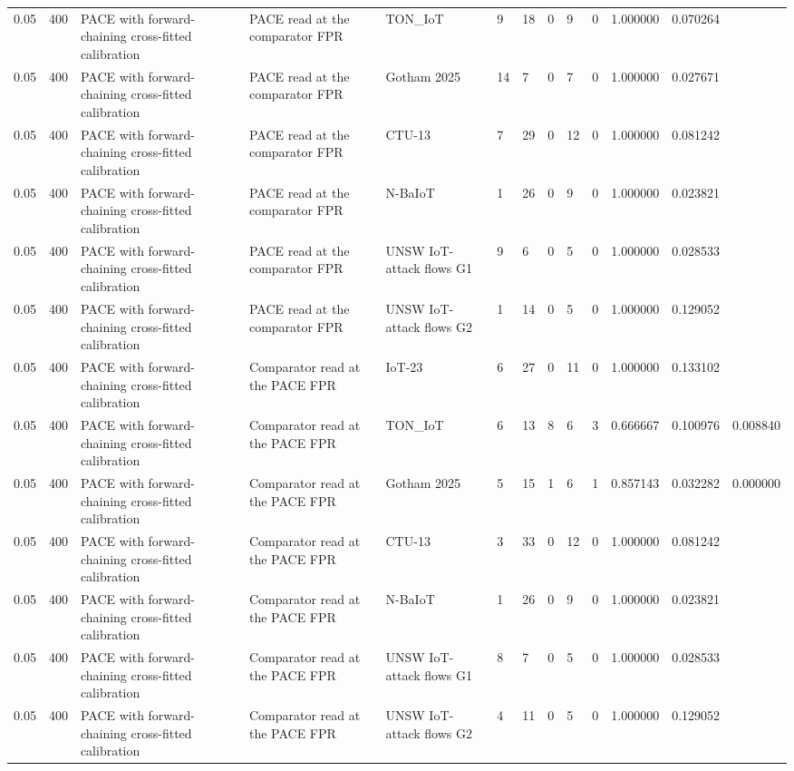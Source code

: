 \begin{tabular}{lllllllllllll}
0.05 & 400 & PACE with forward-chaining cross-fitted calibration & PACE read at the comparator FPR & TON\_IoT & 9 & 18 & 0 & 9 & 0 & 1.000000 & 0.070264 &  \\
0.05 & 400 & PACE with forward-chaining cross-fitted calibration & PACE read at the comparator FPR & Gotham 2025 & 14 & 7 & 0 & 7 & 0 & 1.000000 & 0.027671 &  \\
0.05 & 400 & PACE with forward-chaining cross-fitted calibration & PACE read at the comparator FPR & CTU-13 & 7 & 29 & 0 & 12 & 0 & 1.000000 & 0.081242 &  \\
0.05 & 400 & PACE with forward-chaining cross-fitted calibration & PACE read at the comparator FPR & N-BaIoT & 1 & 26 & 0 & 9 & 0 & 1.000000 & 0.023821 &  \\
0.05 & 400 & PACE with forward-chaining cross-fitted calibration & PACE read at the comparator FPR & UNSW IoT-attack flows G1 & 9 & 6 & 0 & 5 & 0 & 1.000000 & 0.028533 &  \\
0.05 & 400 & PACE with forward-chaining cross-fitted calibration & PACE read at the comparator FPR & UNSW IoT-attack flows G2 & 1 & 14 & 0 & 5 & 0 & 1.000000 & 0.129052 &  \\
0.05 & 400 & PACE with forward-chaining cross-fitted calibration & Comparator read at the PACE FPR & IoT-23 & 6 & 27 & 0 & 11 & 0 & 1.000000 & 0.133102 &  \\
0.05 & 400 & PACE with forward-chaining cross-fitted calibration & Comparator read at the PACE FPR & TON\_IoT & 6 & 13 & 8 & 6 & 3 & 0.666667 & 0.100976 & 0.008840 \\
0.05 & 400 & PACE with forward-chaining cross-fitted calibration & Comparator read at the PACE FPR & Gotham 2025 & 5 & 15 & 1 & 6 & 1 & 0.857143 & 0.032282 & 0.000000 \\
0.05 & 400 & PACE with forward-chaining cross-fitted calibration & Comparator read at the PACE FPR & CTU-13 & 3 & 33 & 0 & 12 & 0 & 1.000000 & 0.081242 &  \\
0.05 & 400 & PACE with forward-chaining cross-fitted calibration & Comparator read at the PACE FPR & N-BaIoT & 1 & 26 & 0 & 9 & 0 & 1.000000 & 0.023821 &  \\
0.05 & 400 & PACE with forward-chaining cross-fitted calibration & Comparator read at the PACE FPR & UNSW IoT-attack flows G1 & 8 & 7 & 0 & 5 & 0 & 1.000000 & 0.028533 &  \\
0.05 & 400 & PACE with forward-chaining cross-fitted calibration & Comparator read at the PACE FPR & UNSW IoT-attack flows G2 & 4 & 11 & 0 & 5 & 0 & 1.000000 & 0.129052 &  \\

\end{tabular}

